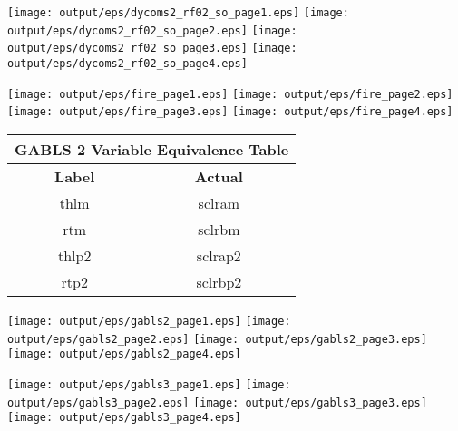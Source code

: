 \documentclass[11pt]{article}
\begin{document}
\begin{center}

\texttt{[image: output/eps/dycoms2\_rf02\_so\_page1.eps]}
\texttt{[image: output/eps/dycoms2\_rf02\_so\_page2.eps]}
\texttt{[image: output/eps/dycoms2\_rf02\_so\_page3.eps]}
\texttt{[image: output/eps/dycoms2\_rf02\_so\_page4.eps]}
\end{center}
\newpage

\begin{center}

\texttt{[image: output/eps/fire\_page1.eps]}
\texttt{[image: output/eps/fire\_page2.eps]}
\texttt{[image: output/eps/fire\_page3.eps]}
\texttt{[image: output/eps/fire\_page4.eps]}
\end{center}
\newpage

\begin{center}

\begin{tabular}{|c|c|}
\hline
\multicolumn{5}{|c|}{\bf GABLS 2 Variable Equivalence Table} \\
\hline
{\bf Label} & {\bf Actual} \\ \hline
thlm & sclram \\ \hline
rtm & sclrbm \\ \hline
thlp2 & sclrap2 \\ \hline
rtp2 & sclrbp2 \\ \hline
\end{tabular}

\texttt{[image: output/eps/gabls2\_page1.eps]}
\texttt{[image: output/eps/gabls2\_page2.eps]}
\texttt{[image: output/eps/gabls2\_page3.eps]}
\texttt{[image: output/eps/gabls2\_page4.eps]}
\end{center}
\newpage

\begin{center}

\texttt{[image: output/eps/gabls3\_page1.eps]}
\texttt{[image: output/eps/gabls3\_page2.eps]}
\texttt{[image: output/eps/gabls3\_page3.eps]}
\texttt{[image: output/eps/gabls3\_page4.eps]}
\end{center}
\newpage
\end{document}
